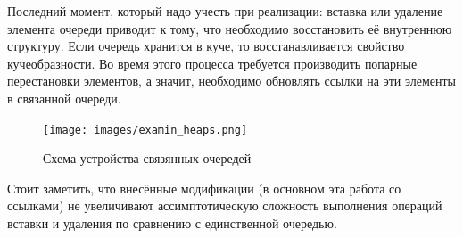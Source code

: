 \par
Последний момент, который надо учесть при реализации: вставка или удаление элемента очереди приводит к тому, что необходимо восстановить её внутреннюю структуру.
Если очередь хранится в куче, то восстанавливается свойство кучеобразности. Во время этого процесса
требуется производить попарные перестановки элементов, а значит, необходимо обновлять ссылки на эти элементы в связанной очереди.
\begin{figure}[ht]
  \center
  \texttt{[image: images/examin\_heaps.png]}
  \caption{Схема устройства связянных очередей}
  \label{fig:heaps}
\end{figure}
\par
Стоит заметить, что внесённые модификации (в основном эта работа со ссылками) не увеличивают ассимптотическую сложность выполнения операций вставки и удаления по сравнению с единственной очередью.
